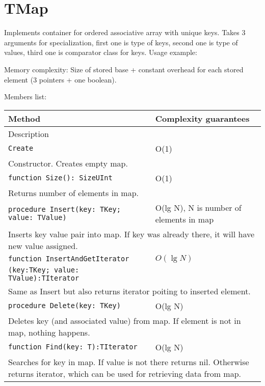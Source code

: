 \chapter{TMap}

Implements container for ordered associative array with unique keys.
Takes 3 arguments for specialization, first one is type of keys, second one is type of values, third
one is comparator class for keys.
Usage example:



Memory complexity:
Size of stored base + constant overhead for each stored element (3 pointers + one boolean).

Members list:

\begin{longtable}{|m{10cm}|m{5cm}|}
\hline
Method & Complexity guarantees \\ \hline
\multicolumn{2}{|m{15cm}|}{Description} \\ \hline\hline

\verb!Create! & O(1) \\ \hline
\multicolumn{2}{|m{15cm}|}{Constructor. Creates empty map.} \\ \hline\hline

\verb!function Size(): SizeUInt! & O(1) \\ \hline
\multicolumn{2}{|m{15cm}|}{Returns number of elements in map.} \\\hline\hline

\verb!procedure Insert(key: TKey; value: TValue)! &
O(lg N), N is number of elements in map \\ \hline
\multicolumn{2}{|m{15cm}|}{Inserts key value pair into map. If key was already there, it will have
new value assigned.} \\\hline\hline

\verb!function InsertAndGetIterator! & $O(\lg N)$\\
\verb!(key:TKey; value: TValue):TIterator! & \\ \hline
\multicolumn{2}{|m{15cm}|}{Same as Insert but also returns iterator poiting to inserted element.} \\\hline\hline

\verb!procedure Delete(key: TKey)! &
O(lg N) \\ \hline
\multicolumn{2}{|m{15cm}|}{Deletes key (and associated value) from map. If element is not in map, nothing happens.} \\\hline\hline

\verb!function Find(key: T):TIterator! & O(lg N) \\\hline
\multicolumn{2}{|m{15cm}|}{Searches for key in map. If value is not there returns nil. Otherwise
returns iterator, which can be used for retrieving data from map.} \\\hline\hline


\end{longtable}
